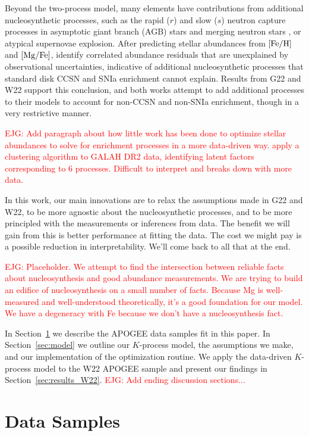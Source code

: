 \documentclass[modern]{aastex631}
\newcommand{\mgfe}[0]{[{\rm Mg/Fe}]}
\newcommand{\feh}[0]{[{\rm Fe/H}]}
\newcommand{\ejg}[1]{\textcolor{red}{EJG: #1}}
\begin{document}
Beyond the two-process model, many elements have contributions from additional nucleosynthetic processes, such as the rapid ($r$) and slow ($s$) neutron capture processes \citep{arlandini1999, bisterzo2014} in asymptotic giant branch (AGB) stars \citep[e.g.,][]{simmerer2004, karakas2016} and merging neutron stars \citep{kilpatrick2017}, or atypical supernovae explosion. After predicting stellar abundances from $\feh$ and $\mgfe$, \citet{ting2022} identify correlated abundance residuals that are unexplained by observational uncertainties, indicative of additional nucleosynthetic processes that standard disk CCSN and SNIa enrichment cannot explain. Results from G22 and W22 support this conclusion, and both works attempt to add additional processes to their models to account for non-CCSN and non-SNIa enrichment, though in a very restrictive manner.

\ejg{Add paragraph about how little work has been done to optimize stellar abundances to solve for enrichment processes in a more data-driven way. \citet{casey2019} apply a clustering algorithm to GALAH DR2 data, identifying latent factors corresponding to 6 processes. Difficult to interpret and breaks down with more data.}

In this work, our main innovations are to relax the assumptions made in G22 and W22, to be more agnostic about the nucleosynthetic processes, and to be more principled with the measurements or inferences from data. The benefit we will gain from this is better performance at fitting the data.
The cost we might pay is a possible reduction in interpretability.
We'll come back to all that at the end.

\ejg{Placeholder. We attempt to find the intersection between reliable facts about nucleosynthesis and good abundance measurements. We are trying to build an edifice of nucleosynthesis on a small number of facts. Because Mg is well-measured and well-understood theoretically, it's a good foundation for our model. We have a degeneracy with Fe because we don't have a nucleosynthesis fact.}

In Section~\ref{sec:data} we describe the APOGEE data samples fit in this paper. In Section~\ref{sec:model} we outline our $K$-process model, the assumptions we make, and our implementation of the optimization routine. We apply the data-driven $K$-process model to the W22 APOGEE sample and present our findings in Section~\ref{sec:results_W22}. \ejg{Add ending discussion sections...}


\section{Data Samples}\label{sec:data}
\end{document}
